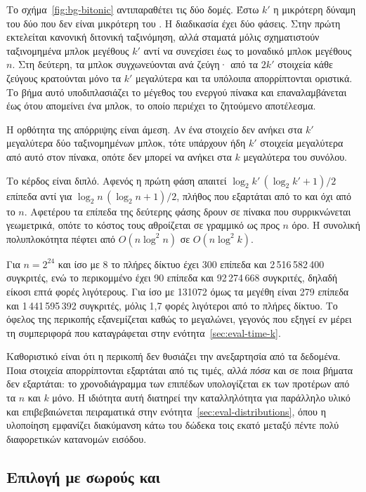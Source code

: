 Το σχήμα~\ref{fig:bg-bitonic} αντιπαραθέτει τις δύο δομές. Έστω $k'$ η
μικρότερη δύναμη του δύο που δεν είναι μικρότερη του . Η
διαδικασία έχει δύο φάσεις. Στην πρώτη εκτελείται κανονική διτονική ταξινόμηση,
αλλά σταματά μόλις σχηματιστούν ταξινομημένα μπλοκ μεγέθους $k'$ αντί να
συνεχίσει έως το μοναδικό μπλοκ μεγέθους $n$. Στη δεύτερη, τα μπλοκ
συγχωνεύονται ανά ζεύγη· από τα $2k'$ στοιχεία κάθε ζεύγους κρατούνται μόνο τα
$k'$ μεγαλύτερα και τα υπόλοιπα απορρίπτονται οριστικά. Το βήμα αυτό
υποδιπλασιάζει το μέγεθος του ενεργού πίνακα και επαναλαμβάνεται έως ότου
απομείνει ένα μπλοκ, το οποίο περιέχει το ζητούμενο αποτέλεσμα.

Η ορθότητα της απόρριψης είναι άμεση. Αν ένα στοιχείο δεν ανήκει στα $k'$
μεγαλύτερα δύο ταξινομημένων μπλοκ, τότε υπάρχουν ήδη $k'$ στοιχεία μεγαλύτερα
από αυτό στον πίνακα, οπότε δεν μπορεί να ανήκει στα $k$ μεγαλύτερα του
συνόλου.

Το κέρδος είναι διπλό. Αφενός η πρώτη φάση απαιτεί
$\log_2 k' \, (\log_2 k' + 1)/2$ επίπεδα αντί για
$\log_2 n \, (\log_2 n + 1)/2$, πλήθος που εξαρτάται από το  και όχι από το
$n$. Αφετέρου τα επίπεδα της δεύτερης φάσης δρουν σε πίνακα που συρρικνώνεται
γεωμετρικά, οπότε το κόστος τους αθροίζεται σε γραμμικό ως προς $n$ όρο. Η
συνολική πολυπλοκότητα πέφτει από $O(n \log^2 n)$ σε $O(n \log^2 k)$.

Για $n = 2^{24}$ και  ίσο με 8 το πλήρες δίκτυο έχει 300 επίπεδα και
2\,516\,582\,400 συγκριτές, ενώ το περικομμένο έχει 90 επίπεδα και
92\,274\,668 συγκριτές, δηλαδή είκοσι επτά φορές λιγότερους. Για  ίσο με
131072 όμως τα μεγέθη είναι 279 επίπεδα και 1\,441\,595\,392 συγκριτές, μόλις
1,7 φορές λιγότεροι από το πλήρες δίκτυο. Το όφελος της περικοπής εξανεμίζεται
καθώς το  μεγαλώνει, γεγονός που εξηγεί εν μέρει τη συμπεριφορά που
καταγράφεται στην ενότητα~\ref{sec:eval-time-k}.

Καθοριστικό είναι ότι η περικοπή δεν θυσιάζει την ανεξαρτησία από τα δεδομένα.
Ποια στοιχεία απορρίπτονται εξαρτάται από τις τιμές, αλλά \emph{πόσα} και σε
ποια βήματα δεν εξαρτάται: το χρονοδιάγραμμα των επιπέδων υπολογίζεται εκ των
προτέρων από τα $n$ και $k$ μόνο. Η ιδιότητα αυτή διατηρεί την καταλληλότητα για
παράλληλο υλικό και επιβεβαιώνεται πειραματικά στην
ενότητα~\ref{sec:eval-distributions}, όπου η υλοποίηση εμφανίζει διακύμανση κάτω
του δώδεκα τοις εκατό μεταξύ πέντε πολύ διαφορετικών κατανομών εισόδου.



\subsection{Επιλογή με σωρούς και }
\label{sec:bg-mapreduce}

